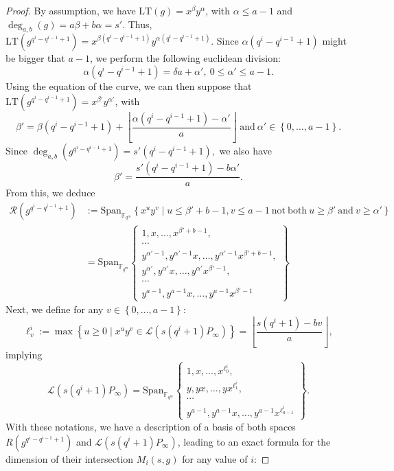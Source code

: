 \documentclass[a4paper]{article}
\theoremstyle{definition}
\theoremstyle{remark}
\newcommand{\calL}{\mathcal{L}}
\newcommand{\calR}{\mathcal{R}}
\newcommand{\fqm}{\mathbb{F}_{q^m}}
\newcommand{\set}[1]{\left\{#1\right\}}
\newcommand{\degab}[1]{\deg_{a,b}\left(#1\right)}
\begin{document}
\begin{proof}


By assumption, we have $\mathrm{LT}(g)=x^{\beta}y^{\alpha}$, with $\alpha \leq a-1$ and $\degab{g}=a\beta +b\alpha=s'$. 
Thus, $\mathrm{LT}(g^{q^i-q^{i-1}+1})=x^{\beta (q^i-q^{i-1}+1)}y^{\alpha (q^i-q^{i-1}+1)}$. Since $\alpha (q^i-q^{i-1}+1)$ might be bigger that $a-1$, we perform the following euclidean division:
$$\alpha (q^i-q^{i-1}+1) = \delta a + \alpha', \ 0 \leq \alpha' \leq a-1.$$
Using the equation of the curve, we can then suppose that $\mathrm{LT}(g^{q^i-q^{i-1}+1})=x^{\beta'}y^{\alpha '}$, with 
$$\beta' = \beta (q^i-q^{i-1}+1) + \left\lfloor \frac{\alpha (q^i-q^{i-1}+1)-\alpha'}{a} \right\rfloor \ \mathrm{and} \ \alpha' \in \set{0,\dots,a-1}.$$
Since $\degab{g^{q^i-q^{i-1}+1}} = s'(q^i-q^{i-1}+1),$ we also have 
\begin{equation} \label{eq:value_beta_prime}
\beta' = \dfrac{s'(q^i-q^{i-1}+1)-b\alpha'}{a}.
\end{equation}
From this, we deduce
\begin{align*}
\calR\left(g^{q^i-q^{i-1}+1}\right) &:= \mathrm{Span}_{\fqm} \left\{x^uy^v \mid u \leq \beta'+b-1 , v \leq a-1 \ \mathrm{not \ both} \ u \geq \beta' \ \mathrm{and} \ v \geq \alpha'\right\} \\
&= \mathrm{Span}_{\fqm}    \left\{ \begin{array}{c}
         1,x,\dots,x^{\beta' +b-1},   \\
         \cdots \\
         y^{\alpha' -1},y^{\alpha' -1}x,\dots,y^{\alpha' -1}x^{\beta' +b-1}, \\
          y^{\alpha'},y^{\alpha'}x,\dots,y^{\alpha'}x^{\beta'-1}, \\
         \cdots \\
         y^{a-1},y^{a-1}x,\dots,y^{a-1}x^{\beta'-1}
    \end{array}
    \right\}
\end{align*}
Next, we define for any $v \in \set{0,\dots,a-1}$:
$$\ell^i_v := \max \set{u \geq 0 \mid x^uy^v \in \calL(s(q^i+1)P_\infty)} = \left\lfloor \dfrac{s(q^i+1)-bv}{a}\right\rfloor,$$
implying
\begin{equation*}
\calL(s(q^i+1)P_\infty) = \mathrm{Span}_{\fqm}    \left\{ \begin{array}{c}
         1,x,\dots,x^{\ell^i_0},   \\
         y,yx,\dots,yx^{\ell^i_1}, \\
         \cdots \\
         y^{a-1},y^{a-1}x,\dots,y^{a-1}x^{\ell^i_{a-1}}
    \end{array}
    \right\}.
\end{equation*}
With these notations, we have a description of a basis of both spaces $R(g^{q^i-q^{i-1}+1})$ and $\calL(s(q^i+1)P_\infty)$, leading to an exact formula for the dimension of their intersection $M_i(s,g)$ for any value of $i$:



\end{proof}
\end{document}

